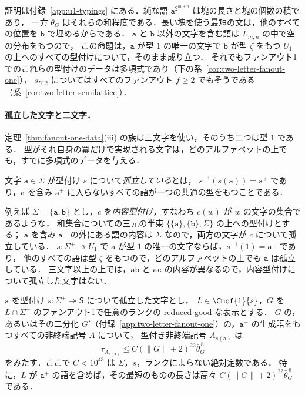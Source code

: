 証明は付録~\ref{app:u1-typings} にある．純な語 $\mathtt a^{2^{m+n}}$ は塊の長さと塊の個数の積であり，
一方 $\bar\theta_G$ はそれらの和程度である．長い塊を使う最短の文は，他のすべての位置を $\mathtt b$ で埋めるからである．
$\mathtt a$ と $\mathtt b$ 以外の文字を含む語は $L_{m,n}$ の中で空の分布をもつので，
この命題は，$\mathtt a$ が型 $1$ の唯一の文字で $\mathtt b$ が型 $\zeta$ をもつ $U_1$ の上へのすべての型付けについて，そのまま成り立つ．
それでもファンアウト1でのこれらの型付けのデータは多項式であり（下の系~\ref{cor:two-letter-fanout-one}），
$s_{U,2}$ についてはすべてのファンアウト $f\ge2$ でもそうである（系~\ref{cor:two-letter-semilattice}）．

\paragraph{孤立した文字と二文字．}
定理~\ref{thm:fanout-one-data}(iii) の族は三文字を使い，そのうち二つは型 $1$ である．
型がそれ自身の冪だけで実現される文字は，どのアルファベットの上でも，すでに多項式のデータを与える．

\begin{definition}[孤立した文字]
\label{def:isolated-letter}
文字 $\mathtt a\in\Sigma$ が型付け $s$ について\emph{孤立している}とは，
$s^{-1}(s(\mathtt a))=\mathtt a^+$ であり，$\mathtt a$ を含み $\mathtt a^+$ に入らないすべての語が一つの共通の型をもつことである．
\end{definition}

例えば $\Sigma=\{\mathtt a,\mathtt b\}$ とし，$c$ を\emph{内容型付け}，すなわち $c(w)$ が $w$ の文字の集合であるような，
和集合についての三元の半束 $\{\{\mathtt a\},\{\mathtt b\},\Sigma\}$ の上への型付けとする；
$\mathtt a$ を含み $\mathtt a^+$ の外にある語の内容は $\Sigma$ なので，両方の文字が $c$ について孤立している．
$s:\Sigma^+\twoheadrightarrow U_1$ で $\mathtt a$ が型 $1$ の唯一の文字ならば，$s^{-1}(1)=\mathtt a^+$ であり，
他のすべての語は型 $\zeta$ をもつので，どのアルファベットの上でも $\mathtt a$ は孤立している．
三文字以上の上では，$\mathtt{ab}$ と $\mathtt{ac}$ の内容が異なるので，内容型付けについて孤立した文字はない．

\begin{theorem}
\label{thm:two-letter-fanout-one}
$\mathtt a$ を型付け $s:\Sigma^+\twoheadrightarrow\mathsf S$ について孤立した文字とし，
$L\in\Cmcf{1}{s}$，$G$ を $L\cap\Sigma^+$ のファンアウト1で任意のランクの reduced good な表示とする．
$G$ の，あるいはその二分化 $G'$（付録~\ref{app:two-letter-fanout-one}）の，$\mathtt a^+$ の生成語をもつすべての非終端記号 $A$ について，
型付き非終端記号 $A_{s(\mathtt a)}$ は
\[
 \tau_{A_{s(\mathtt a)}}\le C(\|G\|+2)^{22}\bar\theta_G^{\,8}
\]
をみたす．ここで $C<10^{43}$ は $\Sigma$，$s$，ランクによらない絶対定数である．
特に，$L$ が $\mathtt a^+$ の語を含めば，その最短のものの長さは高々 $C(\|G\|+2)^{22}\bar\theta_G^{\,8}$ である．
\end{theorem}

